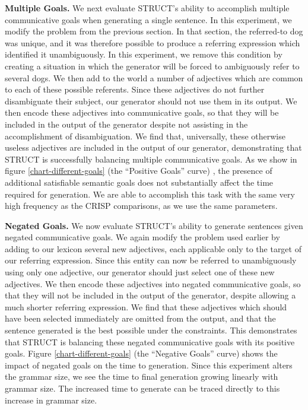 {\bf Multiple Goals.} We next evaluate STRUCT's ability to accomplish
multiple communicative goals when generating a single sentence.  In this
experiment, we modify the problem from the 
previous section.  In that section, the referred-to dog was unique,
and it was therefore possible to produce a referring expression which
identified it unambiguously.  In this experiment, we remove this
condition by creating a situation in which the generator will be
forced to ambiguously refer to several dogs.  We then add to the
world a number of adjectives which are common to each of these
possible referents.  Since these adjectives do not further
disambiguate their subject, our generator should not use
them in its output.  We then encode these adjectives into
communicative goals, so that they will be included in the output of
the generator despite not assisting in the accomplishment of
disambiguation.  We find that, universally, these otherwise useless
adjectives are included in the output of our generator, demonstrating
that STRUCT is successfully balancing multiple communicative goals.
As we show in figure \ref{chart-different-goals} (the ``Positive
Goals'' curve) , the presence of additional satisfiable semantic goals does not substantially affect the time required for generation.  We are able to accomplish this task with the same very high frequency as the CRISP comparisons, as we use the same parameters.

{\bf Negated Goals.} We now evaluate STRUCT's ability to generate
sentences given negated communicative goals.  We again modify
the problem used earlier by 
adding to our lexicon several new adjectives, each applicable only to
the target of our referring expression.  Since this entity can now be
referred to unambiguously using only one adjective, our generator
should just select one of these new adjectives.  We then encode these
adjectives into negated communicative goals, so that they will not be
included in the output of the generator, despite allowing a much
shorter referring expression.  We find that these adjectives which
should have been selected immediately are omitted from the output, and
that the sentence generated is the best possible under the
constraints.  This demonstrates that STRUCT is balancing these negated
communicative goals with its positive goals.  Figure
\ref{chart-different-goals} (the ``Negative Goals'' curve) shows the
impact of negated goals on the time to generation.  Since this
experiment alters the grammar size, we see the time to final
generation growing linearly with grammar size.  The increased time to
generate can be traced directly to this increase in grammar size.

